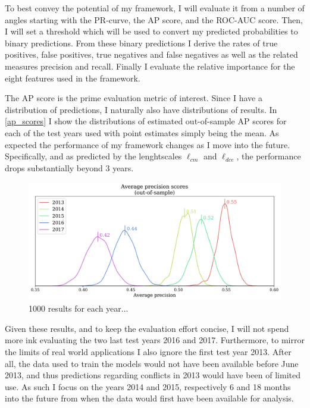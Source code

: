 \documentclass[a4paper]{article}
\begin{document}
To best convey the potential of my framework, I will evaluate it from a number of angles starting with the PR-curve, the AP score, and the ROC-AUC score. Then, I will set a threshold which will be used to convert my predicted probabilities to binary predictions. From these binary predictions I derive the rates of true positives, false positives, true negatives and false negatives as well as the related measures precision and recall. Finally I evaluate the relative importance for the eight features used in the framework.\par

The AP score is the prime evaluation metric of interest. Since I have a distribution of predictions, I naturally also have distributions of results. In \autoref{ap_scores} I show the distributions of estimated out-of-sample AP scores for each of the test years used with point estimates simply being the mean. As expected the performance of my framework changes as I move into the future. Specifically, and as predicted by the lenghtscales $\ell_{cm}$ and $\ell_{dce}$, the performance drops substantially beyond 3 years.\par

\begin{figure}[!htb]
	\centering
	\includegraphics[scale=0.47]{ap_scores.pdf}
    \caption{\footnotesize{1000 results for each year...}}\label{ap_scores}
\end{figure}

Given these results, and to keep the evaluation effort concise, I will not spend more ink evaluating the two last test years 2016 and 2017. Furthermore, to mirror the limits of real world applications I also ignore the first test year 2013. After all, the data used to train the models would not have been available before June 2013, and thus predictions regarding conflicts in 2013 would have been of limited use. As such I focus on the years 2014 and 2015, respectively 6 and 18 months into the future from when the data would first have been available for analysis.\par %
\end{document}
